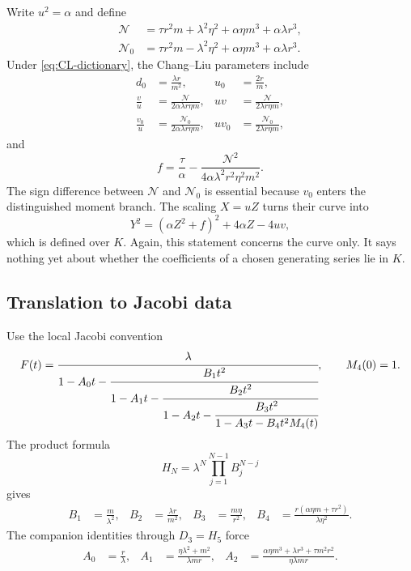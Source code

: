 \documentclass[11pt]{article}
\theoremstyle{definition}
\theoremstyle{remark}
\begin{document}
Write $u^2=\alpha$ and define
\begin{align}
 \mathcal N&=\tau r^2m+\lambda^2\eta^2+\alpha\eta m^3+\alpha\lambda r^3,
 \label{eq:CL-Nplus}\\
 \mathcal N_0&=\tau r^2m-\lambda^2\eta^2+\alpha\eta m^3+\alpha\lambda r^3.
 \label{eq:CL-Nminus}
\end{align}
Under \eqref{eq:CL-dictionary}, the Chang--Liu parameters include
\begin{align}
 d_0&=\frac{\lambda r}{m^2},&u_0&=\frac{2r}{m},\\
 \frac vu&=\frac{\mathcal N}{2\alpha\lambda r\eta m},&
 uv&=\frac{\mathcal N}{2\lambda r\eta m},\\
 \frac{v_0}{u}&=\frac{\mathcal N_0}{2\alpha\lambda r\eta m},&
 uv_0&=\frac{\mathcal N_0}{2\lambda r\eta m},
 \label{eq:CL-parameters}
\end{align}
and
\begin{equation}
 f=\frac{\tau}{\alpha}-
 \frac{\mathcal N^2}{4\alpha\lambda^2r^2\eta^2m^2}.
 \label{eq:CL-f}
\end{equation}
The sign difference between $\mathcal N$ and $\mathcal N_0$ is essential because $v_0$ enters the distinguished moment branch.
The scaling $X=uZ$ turns their curve into
\begin{equation}
 Y^2=(\alpha Z^2+f)^2+4\alpha Z-4uv,
 \label{eq:CL-descended-curve}
\end{equation}
which is defined over $K$. Again, this statement concerns the curve only.  It says nothing yet about whether the coefficients of a chosen generating series lie in $K$.

\subsection{Translation to Jacobi data}
Use the local Jacobi convention
\begin{equation}
 F(t)=\cfrac{\lambda}{1-A_0t-
 \cfrac{B_1t^2}{1-A_1t-
 \cfrac{B_2t^2}{1-A_2t-
 \cfrac{B_3t^2}{1-A_3t-B_4t^2M_4(t)}}}},
 \qquad M_4(0)=1.
 \label{eq:local-jacobi-convention}
\end{equation}
The product formula
\begin{equation}
 H_N=\lambda^N\prod_{j=1}^{N-1}B_j^{N-j}
 \label{eq:J-Hankel-product}
\end{equation}
gives
\begin{align}
 B_1&=\frac{m}{\lambda^2},&
 B_2&=\frac{\lambda r}{m^2},&
 B_3&=\frac{m\eta}{r^2},&
 B_4&=\frac{r(\alpha\eta m+\tau r^2)}{\lambda\eta^2}.
 \label{eq:first-B}
\end{align}
The companion identities through $D_3=H_5$ force
\begin{align}
 A_0&=\frac r\lambda,&
 A_1&=\frac{\eta\lambda^2+m^2}{\lambda mr},&
 A_2&=\frac{\alpha\eta m^3+\lambda r^3+\tau m^2r^2}{\eta\lambda mr}.
 \label{eq:first-A}
\end{align}
\end{document}
